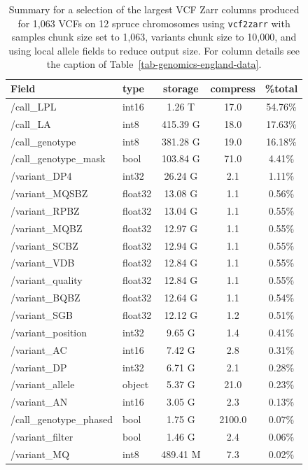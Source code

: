 \documentclass[a4paper,num-refs]{oup-contemporary}
\begin{document}
\begin{table}
\caption{Summary for a selection of the largest VCF Zarr columns
produced for 1,063 VCFs on 12 spruce chromosomes using
\texttt{vcf2zarr} with samples chunk size set to 1,063, variants
chunk size to 10,000, and using local allele fields to reduce output
size. For column details see the caption of
Table~\ref{tab-genomics-england-data}.
\label{tab-spruce-data}}

\begin{tabular}{llS[table-format=3.2]S[table-format=3.2]S[table-format=3.2]}
\toprule
{Field} & {type} & {storage} & {compress} & {\%total} \\
\midrule
/call\_LPL & int16 & 1.26 T & 17.0 & 54.76\% \\
/call\_LA & int8 & 415.39 G & 18.0 & 17.63\% \\
/call\_genotype & int8 & 381.28 G & 19.0 & 16.18\% \\
/call\_genotype\_mask & bool & 103.84 G & 71.0 & 4.41\% \\
/variant\_DP4 & int32 & 26.24 G & 2.1 & 1.11\% \\
/variant\_MQSBZ & float32 & 13.08 G & 1.1 & 0.56\% \\
/variant\_RPBZ & float32 & 13.04 G & 1.1 & 0.55\% \\
/variant\_MQBZ & float32 & 12.97 G & 1.1 & 0.55\% \\
/variant\_SCBZ & float32 & 12.94 G & 1.1 & 0.55\% \\
/variant\_VDB & float32 & 12.84 G & 1.1 & 0.55\% \\
/variant\_quality & float32 & 12.84 G & 1.1 & 0.55\% \\
/variant\_BQBZ & float32 & 12.64 G & 1.1 & 0.54\% \\
/variant\_SGB & float32 & 12.12 G & 1.2 & 0.51\% \\
/variant\_position & int32 & 9.65 G & 1.4 & 0.41\% \\
/variant\_AC & int16 & 7.42 G & 2.8 & 0.31\% \\
/variant\_DP & int32 & 6.71 G & 2.1 & 0.28\% \\
/variant\_allele & object & 5.37 G & 21.0 & 0.23\% \\
/variant\_AN & int16 & 3.05 G & 2.3 & 0.13\% \\
/call\_genotype\_phased & bool & 1.75 G & 2100.0 & 0.07\% \\
/variant\_filter & bool & 1.46 G & 2.4 & 0.06\% \\
/variant\_MQ & int8 & 489.41 M & 7.3 & 0.02\% \\

\end{tabular}
\end{table}
\end{document}
